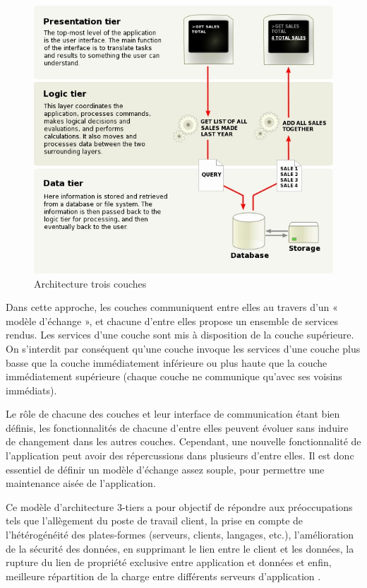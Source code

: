 \begin{figure}[H]
\begin{center}
    \includegraphics[scale=0.6]{img/3-tier}
    \caption{Architecture trois couches}
	\label{3-tier}
\end{center}
\end{figure}

Dans cette approche, les couches communiquent entre elles au travers d'un « modèle d'échange », et chacune d'entre elles propose un ensemble de services rendus. Les services d'une couche sont mis à disposition de la couche supérieure. On s'interdit par conséquent qu'une couche invoque les services d'une couche plus basse que la couche immédiatement inférieure ou plus haute que la couche immédiatement supérieure (chaque couche ne communique qu'avec ses voisins immédiats).

Le rôle de chacune des couches et leur interface de communication étant bien définis, les fonctionnalités de chacune d'entre elles peuvent évoluer sans induire de changement dans les autres couches. Cependant, une nouvelle fonctionnalité de l'application peut avoir des répercussions dans plusieurs d'entre elles. Il est donc essentiel de définir un modèle d'échange assez souple, pour permettre une maintenance aisée de l'application.

Ce modèle d'architecture 3-tiers a pour objectif de répondre aux préoccupations tels que l'allègement du poste de travail client, la prise en compte de l'hétérogénéité des plates-formes (serveurs, clients, langages, etc.), l'amélioration de la sécurité des données, en supprimant le lien entre le client et les données, la rupture du lien de propriété exclusive entre application et données et enfin, meilleure répartition de la charge entre différents serveurs d'application \cite{3-tiers}. 

